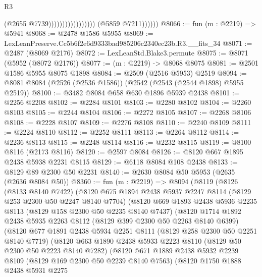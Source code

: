 \begin{lexlean}{R3}
\begin{coremodule}
                                              (@2655 @7739)))))))))))))))))
              (@5859 @7211))))))
@8066 := fun (m : @2219) => @5941
@8068 := @2478 @1586 @5955
@8069 := LexLeanPreserve.Cc5b6f2e6d9333bad985206c2340ec23b.R3.__fits_34
@8071 := @2487 (@8069 @2176)
@8072 := LexLeanStd.Blake3.permute
@8075 := @8071 (@5952 (@8072 @2176))
@8077 := (m : @2219) -> @8068 @8075
@8081 := @2501 @1586 @5955 @8075 @1898
@8084 := @2509 (@2516 @5953) @2519
@8094 := @8081 @8084 (@2526 (@2536 @1586)) (@2542 (@2543 (@2544 @1898) @5955 @2519))
@8100 := @3482 @8084 @658 @630 @1896 @5939 @2438
@8101 := @2256 @2208
@8102 := @2284 @8101
@8103 := @2280 @8102
@8104 := @2260 @8103
@8105 := @2244 @8104
@8106 := @2272 @8105
@8107 := @2268 @8106
@8108 := @2228 @8107
@8109 := @2276 @8108
@8110 := @2240 @8109
@8111 := @2224 @8110
@8112 := @2252 @8111
@8113 := @2264 @8112
@8114 := @2236 @8113
@8115 := @2248 @8114
@8116 := @2232 @8115
@8119 := @8100 @8116 (@2173 @8116)
@8120 := @2597 @8084
@8126 := @8120 @667 @1895 @2438 @5938 @2231 @8115
@8129 := @6118 @8084 @108 @2438
@8133 := @8129 @89 @2300 @50 @2231
@8140 := @2630 @8084 @50 @5953 (@2635 (@2636 @8084 @50))
@8360 := fun (m : @2219) =>
  @8094
    (@8119
      (@8126
        (@8133 @8140 @7422)
        (@8120
          @675
          @1894
          @2438
          @5937
          @2247
          @8114
          (@8129 @253 @2300 @50 @2247 @8140 @7704)
          (@8120
            @669
            @1893
            @2438
            @5936
            @2235
            @8113
            (@8129 @158 @2300 @50 @2235 @8140 @7437)
            (@8120
              @1714
              @1892
              @2438
              @5935
              @2263
              @8112
              (@8129 @399 @2300 @50 @2263 @8140 @6399)
              (@8120
                @677
                @1891
                @2438
                @5934
                @2251
                @8111
                (@8129 @258 @2300 @50 @2251 @8140 @7719)
                (@8120
                  @663
                  @1890
                  @2438
                  @5933
                  @2223
                  @8110
                  (@8129 @50 @2300 @50 @2223 @8140 @7282)
                  (@8120
                    @671
                    @1889
                    @2438
                    @5932
                    @2239
                    @8109
                    (@8129 @169 @2300 @50 @2239 @8140 @7563)
                    (@8120
                      @1750
                      @1888
                      @2438
                      @5931
                      @2275

\end{coremodule}
\end{lexlean}
